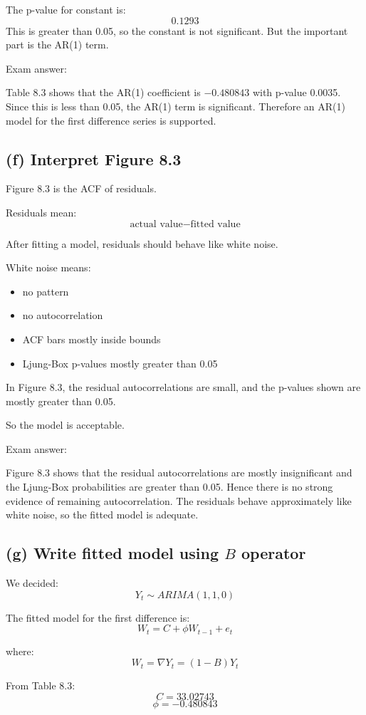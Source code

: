 \documentclass[11pt]{article}
\begin{document}
The p-value for constant is:
\[
0.1293
\]
This is greater than 0.05, so the constant is not significant. But the important part is the AR(1) term.

Exam answer:

Table 8.3 shows that the AR(1) coefficient is $-0.480843$ with p-value 0.0035. Since this is less than 0.05, the AR(1) term is significant. Therefore an AR(1) model for the first difference series is supported.

\subsection*{(f) Interpret Figure 8.3}
Figure 8.3 is the ACF of residuals.

Residuals mean:
\[
\text{actual value} - \text{fitted value}
\]

After fitting a model, residuals should behave like white noise.

White noise means:
\begin{itemize}
  \item no pattern
  \item no autocorrelation
  \item ACF bars mostly inside bounds
  \item Ljung-Box p-values mostly greater than 0.05
\end{itemize}

In Figure 8.3, the residual autocorrelations are small, and the p-values shown are mostly greater than 0.05.

So the model is acceptable.

Exam answer:

Figure 8.3 shows that the residual autocorrelations are mostly insignificant and the Ljung-Box probabilities are greater than 0.05. Hence there is no strong evidence of remaining autocorrelation. The residuals behave approximately like white noise, so the fitted model is adequate.

\subsection*{(g) Write fitted model using $B$ operator}
We decided:
\[
Y_t \sim ARIMA(1,1,0)
\]

The fitted model for the first difference is:
\[
W_t = C + \phi W_{t-1} + e_t
\]

where:
\[
W_t = \nabla Y_t = (1-B)Y_t
\]

From Table 8.3:
\[
C=33.02743
\]
\[
\phi=-0.480843
\]
\end{document}
